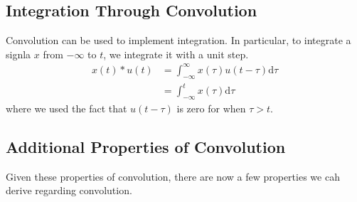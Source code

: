 \documentclass[10pt]{article}
\begin{document}
\subsection*{Integration Through Convolution}
Convolution can be used to implement integration.   In particular, to integrate a signla $x$ from $-\infty$ to $t$, we integrate it with a unit step.
\begin{align*}
    x(t) * u(t) &= \int_{-\infty}^\infty x(\tau) u(t - \tau) \text{d}\tau\\
    &= \int_{-\infty}^t x(\tau) \text{d}\tau
\end{align*}
where we used the fact that $u(t - \tau)$ is zero for when $\tau > t$.

\subsection*{Additional Properties of Convolution}
Given these properties of convolution, there are now a few properties we cah derive regarding convolution.
\end{document}

